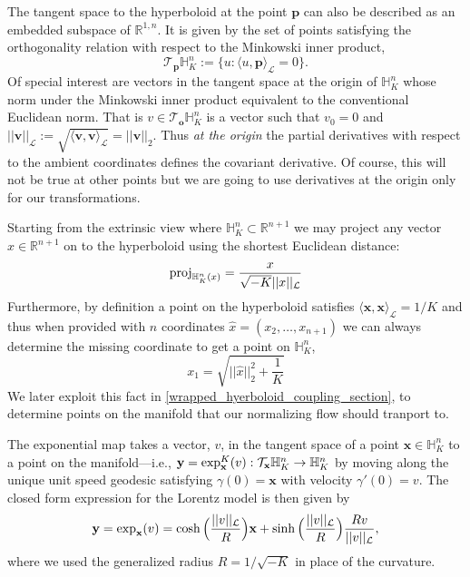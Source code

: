 The tangent space to the hyperboloid at
the point $\textbf{p}$ can also be described as an embedded subspace of
$\mathbb{R}^{1,n}$.  It is given by the set of points satisfying the
orthogonality relation with respect to the Minkowski inner product,
\begin{equation}
    \mathcal{T}_{\textbf{p}}\mathbb{H}^n_K := \{u: \langle u, \textbf{p} \rangle_{\mathcal{L}} = 0 \}.
\end{equation}
Of special interest are vectors in the tangent space at the origin of $\mathbb{H}^{n}_K$ whose norm under the Minkowski inner product equivalent to the conventional Euclidean norm. That is $v \in \mathcal{T}_{\textbf{o}}\mathbb{H}^{n}_K$ is a vector such that $v_0 = 0$ and $||\textbf{v}||_{\mathcal{L}} := \sqrt{\langle \textbf{v}, \textbf{v}
\rangle_{\mathcal{L}}} = ||\textbf{v}||_2$.  Thus \emph{at the origin} the
partial derivatives with respect to the ambient coordinates defines the
covariant derivative.  
Of course, this will not be true at other points but
we are going to use derivatives at the origin only for our transformations.

Starting from the extrinsic view where $\mathbb{H}^{n}_K \subset \mathbb{R}^{n+1}$ we may project any vector $x \in \mathbb{R}^{n+1}$ on to the hyperboloid using the shortest Euclidean distance:
\begin{equation}
    \textnormal{proj}_{\mathbb{H}^{n}_K(x)} = \frac{x}{\sqrt{-K}||x||_{\mathcal{L}}}
\end{equation}
Furthermore, by definition a point on the hyperboloid satisfies $\langle \textbf{x}, \textbf{x} \rangle_{\mathcal{L}} = 1/K$ and thus when provided with $n$ coordinates $\hat{x} = (x_2, \dots, x_{n+1})$ we can always determine the missing coordinate to get a point on $\mathbb{H}^n_K$,
\begin{equation}
    \label{eqn:hyperboloid_projection}
    x_1 = \sqrt{||\hat{x}||^2_2 + \frac{1}{K}}
\end{equation}
We later exploit this fact in \ref{wrapped_hyerboloid_coupling_section}, to determine points on the manifold that our normalizing flow should tranport to.


The exponential map takes a vector, $v$, in the tangent space of a point $\textbf{x} \in \mathbb{H}^{n}_K$ to a point on the manifold---i.e., $\textbf{y} = \textnormal{exp}^K_\textbf{x}(v): \mathcal{T}_{\textbf{x}} \mathbb{H}^{n}_K \to \mathbb{H}^{n}_K$ by moving along the unique unit speed geodesic satisfying $\gamma(0) = \textbf{x}$ with velocity $\gamma '(0)= v$. The closed form expression for the Lorentz model is then given by
\begin{equation*}
    \textbf{y} = \textnormal{exp}_{\textbf{x}} (v) = \cosh \Big(\frac{||v||_{\mathcal{L}}}{R} \Big)\textbf{x} +  \sinh \Big(\frac{||v||_{\mathcal{L}}}{R} \Big)\frac{Rv}{||{v}||_{\mathcal{L}}},
\end{equation*}
where we used the generalized radius $R = 1/\sqrt{-K}$ in place of the curvature.

